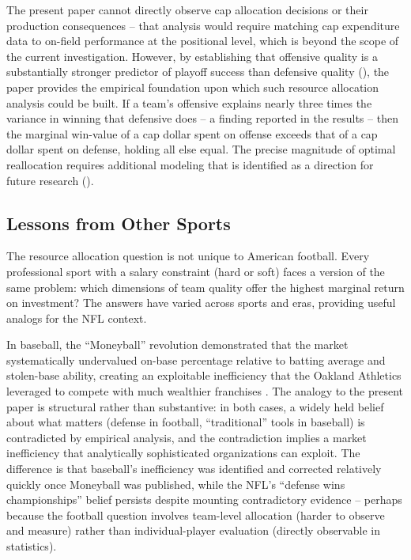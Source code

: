 The present paper cannot directly observe cap allocation decisions or their production consequences  -- that analysis would require matching cap expenditure data to on-field performance at the positional level, which is beyond the scope of the current investigation. However, by establishing that offensive quality is a substantially stronger predictor of playoff success than defensive quality (), the paper provides the empirical foundation upon which such resource allocation analysis could be built. If a team's offensive \xvoa{} explains nearly three times the variance in winning that defensive \xvoa{} does  -- a finding reported in the results  -- then the marginal win-value of a cap dollar spent on offense exceeds that of a cap dollar spent on defense, holding all else equal. The precise magnitude of optimal reallocation requires additional modeling that is identified as a direction for future research ().

\subsection{Lessons from Other Sports}
\label{sec:other-sports-allocation}

The resource allocation question is not unique to American football. Every professional sport with a salary constraint (hard or soft) faces a version of the same problem: which dimensions of team quality offer the highest marginal return on investment? The answers have varied across sports and eras, providing useful analogs for the NFL context.

In baseball, the ``Moneyball'' revolution demonstrated that the market systematically undervalued on-base percentage relative to batting average and stolen-base ability, creating an exploitable inefficiency that the Oakland Athletics leveraged to compete with much wealthier franchises \parencite{lewis2003moneyball}. The analogy to the present paper is structural rather than substantive: in both cases, a widely held belief about what matters (defense in football, ``traditional'' tools in baseball) is contradicted by empirical analysis, and the contradiction implies a market inefficiency that analytically sophisticated organizations can exploit. The difference is that baseball's inefficiency was identified and corrected relatively quickly once Moneyball was published, while the NFL's ``defense wins championships'' belief persists despite mounting contradictory evidence  -- perhaps because the football question involves team-level allocation (harder to observe and measure) rather than individual-player evaluation (directly observable in statistics).

